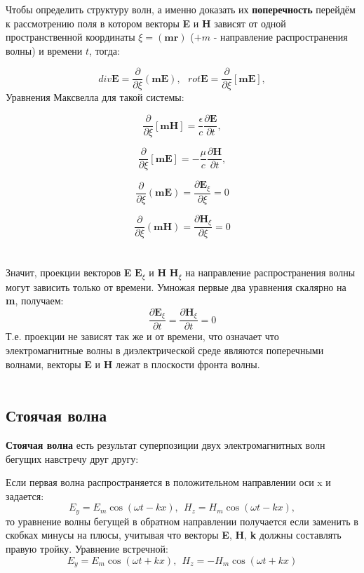 Чтобы определить структуру волн, а именно доказать их \textbf{поперечность} перейдём к рассмотрению поля в котором векторы \textbf{E} и \textbf{H} зависят от одной пространственной координаты $\xi = (\textbf{m}\textbf{r})$ ($+m$ - направление распространения волны) и времени $t$, тогда:

$$ div \textbf{E} = \frac{\partial}{\partial \xi} (\textbf{m}\textbf{E}),
\ \ \ rot \textbf{E} = \frac{\partial}{\partial \xi}[\textbf{m}\textbf{E}],$$
Уравнения Максвелла для такой системы:

$$\frac{\partial}{\partial \xi}[\textbf{m}\textbf{H}] = \frac{\epsilon}{c} \frac{\partial \textbf{E}}{\partial t},$$

$$\frac{\partial}{\partial \xi}[\textbf{m}\textbf{E}] = -\frac{\mu}{c} \frac{\partial \textbf{H}}{\partial t},$$ 

$$\frac{\partial}{\partial \xi} (\textbf{m}\textbf{E}) = \frac{\partial \textbf{E}_\xi}{\partial \xi} = 0$$

$$\frac{\partial}{\partial \xi} (\textbf{m}\textbf{H}) = \frac{\partial \textbf{H}_\xi}{\partial \xi}  = 0$$
\\ \\
Значит, проекции векторов  \textbf{E} $\textbf{E}_\xi $ и \textbf{H} $\textbf{H}_\xi $ на направление распространения волны могут зависить только от времени. Умножая первые два уравнения скалярно на \textbf{m}, получаем:
$$ \frac{\partial \textbf{E}_\xi}{\partial t} = \frac{\partial \textbf{H}_\xi}{\partial t} = 0$$
Т.е. проекции не зависят так же и от времени, что означает что электромагнитные волны в диэлектрической среде являются поперечными волнами, векторы \textbf{E} и \textbf{H} лежат в плоскости фронта волны.\\ \\

\subsection{Стоячая волна}

\textbf{Стоячая волна} есть результат суперпозиции двух электромагнитных волн бегущих навстречу друг другу:

Если первая волна распространяется в положительном направлении оси x и задается: $$E_y = E_m \cos{(\omega t - kx)},\ \ H_z = H_m \cos{(\omega t - kx)},$$ то уравнение волны бегущей в обратном направлении получается если заменить в скобках минусы на плюсы, учитывая что векторы \textbf{E}, \textbf{H}, \textbf{k} должны составлять правую тройку. Уравнение встречной:
$$E_y = E_m \cos{(\omega t + kx)}, \ \ H_z = -H_m \cos{(\omega t + kx)}$$

